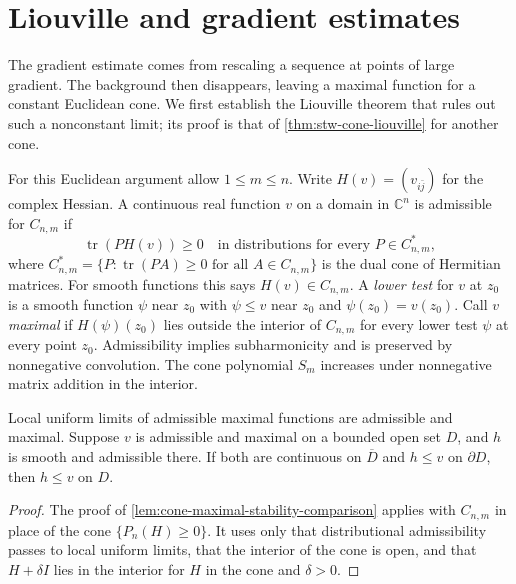 \section{Liouville and gradient estimates}
\label{sec:hessian-liouville}

The gradient estimate comes from rescaling a sequence at points of large
gradient. The background then disappears, leaving a maximal function for
a constant Euclidean cone. We first establish the Liouville theorem that
rules out such a nonconstant limit; its proof is that of
\cref{thm:stw-cone-liouville} for another cone.

For this Euclidean argument allow $1\leq m\leq n$. Write
$H(v)=(v_{i\bar j})$ for the complex Hessian. A continuous real function
$v$ on a domain in $\mathbb C^n$ is admissible for $C_{n,m}$ if
\[
 \operatorname{tr}(PH(v))\geq0
 \quad\text{in distributions for every }P\in C_{n,m}^*,
\]
where $C_{n,m}^*=\{P:\operatorname{tr}(PA)\geq0\text{ for all }A\in C_{n,m}\}$
is the dual cone of Hermitian matrices.
For smooth functions this says $H(v)\in C_{n,m}$. A \emph{lower test}
for $v$ at $z_0$ is a smooth function $\psi$ near $z_0$ with
$\psi\leq v$ near $z_0$ and $\psi(z_0)=v(z_0)$. Call $v$
\emph{maximal} if $H(\psi)(z_0)$ lies outside the interior of $C_{n,m}$
for every lower test $\psi$ at every point $z_0$. Admissibility implies subharmonicity and is
preserved by nonnegative convolution. The cone polynomial $S_m$ increases
under nonnegative matrix addition in the interior.

\begin{lemma}\label{hessian:hessian-cone-stability}
Local uniform limits of admissible maximal functions are admissible and maximal. Suppose $v$ is admissible and maximal on a bounded open set $D$, and $h$ is smooth and admissible there. If both are continuous on $\overline D$ and $h\leq v$ on $\partial D$, then $h\leq v$ on $D$.
\end{lemma}
\begin{proof}
The proof of \cref{lem:cone-maximal-stability-comparison} applies with $C_{n,m}$ in place of the cone $\{P_n(H)\geq0\}$. It uses only that distributional admissibility passes to local uniform limits, that the interior of the cone is open, and that $H+\delta I$ lies in the interior for $H$ in the cone and $\delta>0$.
\end{proof}

